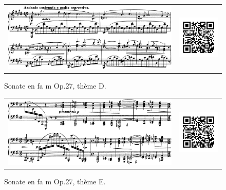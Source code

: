 \begin{figure}[!p]
  \begin{bigcenter}
    \begin{tabular}{lr}
      \includegraphics[width=12.5cm, keepaspectratio]{sonate-theme-D.png}
      &
      \includegraphics[width=3cm, keepaspectratio]{op1-qr.png}
    \end{tabular}
  \end{bigcenter}
  \caption{\label{sonate-theme-4}Sonate en fa m Op.27, thème D.}
\end{figure}

\begin{figure}[!p]
  \begin{bigcenter}
    \begin{tabular}{lr}
      \includegraphics[width=12.5cm, keepaspectratio]{sonate-theme-E.png}
      &
      \includegraphics[width=3cm, keepaspectratio]{op1-qr.png}
    \end{tabular}
  \end{bigcenter}
  \caption{\label{sonate-theme-5}Sonate en fa m Op.27, thème E.}
\end{figure}


